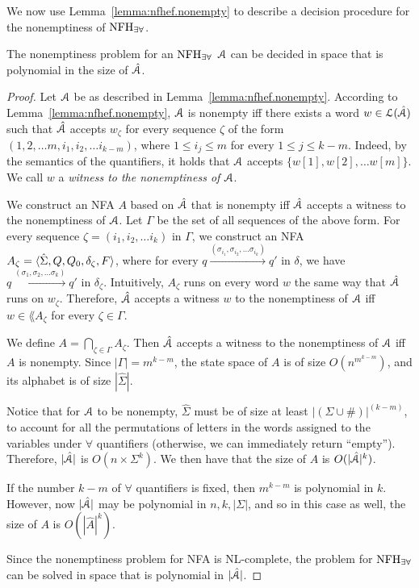 We now use Lemma~\ref{lemma:nfhef.nonempty} to describe a decision procedure for 
the nonemptiness of $\textrm{NFH}_{\exists\forall}$. 

\begin{theorem}\label{thm:nfhef.nonemptiness}
The nonemptiness problem for an $\textrm{NFH}_{\exists\forall}$ $\mathcal{A}$ can be decided in space that is polynomial in the size of $\hat{\mathcal{A}}$.
\end{theorem}

\begin{proof}
Let $\mathcal{A}$ be as described in Lemma~\ref{lemma:nfhef.nonempty}.
According to Lemma~\ref{lemma:nfhef.nonempty}, 
$\mathcal{A}$ is nonempty iff there exists a word $w\in\mathcal{L}(\hat{\mathcal{A}})$ such that
$\hat{\mathcal{A}}$ accepts $w_\zeta$ for every sequence $\zeta$ of the form $(1,2,\ldots m, 
i_1,i_2,\ldots i_{k-m})$, where $1\leq i_j\leq m$ for every $1\leq j \leq k-m$.
Indeed, by the semantics of the quantifiers, it holds that $\mathcal{A}$ accepts 
$\{w[1],w[2],\ldots w[m]\}$.
We call $w$ a {\em witness to the nonemptiness of $\mathcal{A}$}.

We construct an NFA $A$ based on $\hat{\mathcal{A}}$ that is nonempty iff $\hat{\mathcal{A}}$ accepts 
a witness to the nonemptiness of $\mathcal{A}$.
Let $\Gamma$ be the set of all sequences of the above form.
For every sequence $\zeta = (i_1,i_2,\ldots i_k)$ in $\Gamma$, we construct 
an NFA $A_\zeta = \langle  \hat\Sigma,Q,Q_0,\delta_\zeta,F \rangle$, where for every 
$q\xrightarrow{(\sigma_{i_1},\sigma_{i_2},\ldots \sigma_{i_k})} q'$ in $\delta$, 
we have $q\xrightarrow{(\sigma_1,\sigma_2,\ldots \sigma_k)} q'$ in 
$\delta_\zeta$.
Intuitively, $A_{\zeta}$ runs on every word $w$ the same way that $\hat{\mathcal{A}}$ runs 
on $w_\zeta$. Therefore, $\hat{\mathcal{A}}$ accepts a witness $w$ to the nonemptiness of 
$\mathcal{A}$ iff $w\in\lang{A_\zeta}$ for every $\zeta\in\Gamma$. 

We define $A = \bigcap_{\zeta\in\Gamma} A_\zeta$.
Then $\hat{\mathcal{A}}$ accepts a witness to the nonemptiness of $\mathcal{A}$ iff $A$ is 
nonempty. 
Since $|\Gamma| = m^{k-m}$, the state space of $A$ is of size $O(n^{m^{k-m}})$, and its alphabet is of size $|\hat\Sigma|$. 

Notice that for $\mathcal{A}$ to be nonempty, $\hat\Sigma$ must be of size at least $|(\Sigma\cup {\#})|^{(k-m)}$, to account for all the permutations of letters in the words assigned to the variables under $\forall$ quantifiers (otherwise, we can immediately return ``empty''). Therefore, $|\hat{\mathcal{A}}|$ is $O(n\times \Sigma^k)$. 
We then have that the size of $A$ is $O(|\hat {\mathcal{A}}|^k)$.  

If the number $k-m$ of $\forall$ quantifiers is fixed, then $m^{k-m}$ is polynomial in $k$. However, now $|\hat{\mathcal{A}}|$ may be polynomial in $n,k,|\Sigma|$, and so in this case as well, the size of $A$ is $O(|\hat A|^k)$. 

Since the nonemptiness problem for NFA is NL-complete, the problem for $\textrm{NFH}_{\exists\forall}$ can be solved in space that is polynomial in $|{\hat{\mathcal{A}}}|$. 

\end{proof}


